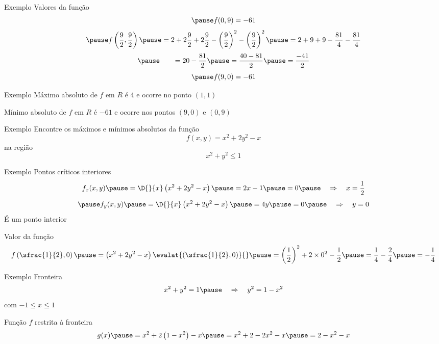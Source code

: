 \begin{frame}{Exemplo \theexemplo}
    Valores da função
    \[
      \pause
      f(0, 9) = -61
    \]
    \[
      \pause
      f\left(\frac{9}{2}, \frac{9}{2}\right)
      \pause
      = 2 + 2\frac{9}{2} + 2\frac{9}{2} - \left(\frac{9}{2}\right)^2 - \left(\frac{9}{2}\right)^2
      \pause
      = 2 + 9 + 9 -\frac{81}{4} -\frac{81}{4}
      \]
      \[
      \pause
      \hphantom{p(x)}
      = 20 -\frac{81}{2}
      \pause
      = \frac{40-81}{2}
      \pause
      = \frac{-41}{2}
    \]
    \[
      \pause
      f(9, 0) = -61
    \]
\end{frame}

\begin{frame}{Exemplo \theexemplo}
  Máximo absoluto de $f$ em $R$ é 4 e ocorre no ponto \((1, 1)\)

  \vspace{\baselineskip}
  Mínimo absoluto de $f$ em $R$ é $-61$ e ocorre nos pontos \((9, 0)\) e \((0, 9)\)
\end{frame}

\addtocounter{exemplo}{1}
\begin{frame}{Exemplo \theexemplo}
  Encontre os máximos e mínimos absolutos da função
  \[
    f(x, y) = x^2 + 2y^2 - x
  \]
  na região
  \[
    x^2 + y^2 \leq 1
  \]
\end{frame}

\begin{frame}{Exemplo \theexemplo}
  Pontos críticos interiores
  \[
    f_x(x, y)
    \pause
    = \D{}{x}\left(x^2 + 2y^2 - x\right)
    \pause
    = 2x-1
    \pause
    = 0
    \pause
    \quad\Rightarrow\quad
    x = \frac{1}{2}
  \]
  \[
    \pause
    f_y(x, y)
    \pause
    = \D{}{x}\left(x^2 + 2y^2 - x\right)
    \pause
    = 4y
    \pause
    = 0
    \pause
    \quad\Rightarrow\quad
    y = 0
  \]
  \pause
  É um ponto interior

  \pause
  \vspace{\baselineskip}
  Valor da função
  \[
    f\left(\sfrac{1}{2}, 0\right)
    \pause
    = \left(x^2 + 2y^2 - x\right)\evalat{\left(\sfrac{1}{2}, 0\right)}{}
    \pause
    = \left(\frac{1}{2}\right)^2 + 2\times 0 ^2 - \frac{1}{2}
    \pause
    = \frac{1}{4} - \frac{2}{4}
    \pause
    = -\frac{1}{4}
  \]
\end{frame}

\begin{frame}{Exemplo \theexemplo}
  Fronteira
  \[
    x^2+y^2 = 1
    \pause
    \quad\Rightarrow\quad
    y^2 = 1 - x^2
  \]
  \pause
  com \(-1\leq x \leq 1\)

  \pause
  \vspace{\baselineskip}
  Função $f$ restrita à fronteira
  \[
    g(x)
    \pause
    = x^2 + 2\left(1 - x^2\right) -x
    \pause
    = x^2 + 2 - 2x^2 - x
    \pause
    = 2 - x^2 - x
  \]
\end{frame}

